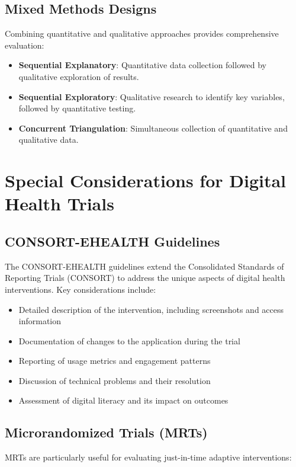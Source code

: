 \subsection{Mixed Methods Designs}
Combining quantitative and qualitative approaches provides comprehensive evaluation:

\begin{itemize}
    \item \textbf{Sequential Explanatory}: Quantitative data collection followed by qualitative exploration of results.
    \item \textbf{Sequential Exploratory}: Qualitative research to identify key variables, followed by quantitative testing.
    \item \textbf{Concurrent Triangulation}: Simultaneous collection of quantitative and qualitative data.
\end{itemize}

\section{Special Considerations for Digital Health Trials}
\subsection{CONSORT-EHEALTH Guidelines}
The CONSORT-EHEALTH guidelines extend the Consolidated Standards of Reporting Trials (CONSORT) to address the unique aspects of digital health interventions. Key considerations include:

\begin{itemize}
    \item Detailed description of the intervention, including screenshots and access information
    \item Documentation of changes to the application during the trial
    \item Reporting of usage metrics and engagement patterns
    \item Discussion of technical problems and their resolution
    \item Assessment of digital literacy and its impact on outcomes
\end{itemize}

\subsection{Microrandomized Trials (MRTs)}
MRTs are particularly useful for evaluating just-in-time adaptive interventions:

